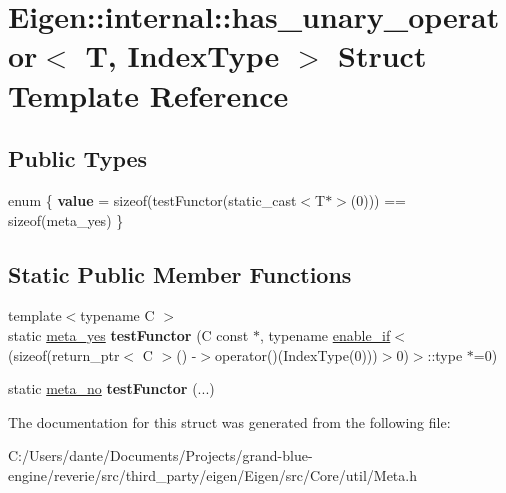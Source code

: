 \hypertarget{struct_eigen_1_1internal_1_1has__unary__operator}{}\section{Eigen\+::internal\+::has\+\_\+unary\+\_\+operator$<$ T, Index\+Type $>$ Struct Template Reference}
\label{struct_eigen_1_1internal_1_1has__unary__operator}
\subsection*{Public Types}
\begin{DoxyCompactItemize}
\item 
\mbox{\label{struct_eigen_1_1internal_1_1has__unary__operator_a4f4fdccaab661de0c2f2f233c7d490cc}} 
enum \{ {\bfseries value} = sizeof(test\+Functor(static\+\_\+cast$<$T$\ast$$>$(0))) == sizeof(meta\+\_\+yes)
 \}
\end{DoxyCompactItemize}
\subsection*{Static Public Member Functions}
\begin{DoxyCompactItemize}
\item 
\mbox{\label{struct_eigen_1_1internal_1_1has__unary__operator_aa954cf07979feb0991fbc745de948edd}} 
{\footnotesize template$<$typename C $>$ }\\static \mbox{\hyperlink{struct_eigen_1_1internal_1_1meta__yes}{meta\+\_\+yes}} {\bfseries test\+Functor} (C const $\ast$, typename \mbox{\hyperlink{struct_eigen_1_1internal_1_1enable__if}{enable\+\_\+if}}$<$(sizeof(return\+\_\+ptr$<$ C $>$() -\/$>$operator()(Index\+Type(0)))$>$0)$>$\+::type $\ast$=0)
\item 
\mbox{\label{struct_eigen_1_1internal_1_1has__unary__operator_aa4170dd8818e2f8a1fc3e075ccadd7b7}} 
static \mbox{\hyperlink{struct_eigen_1_1internal_1_1meta__no}{meta\+\_\+no}} {\bfseries test\+Functor} (...)
\end{DoxyCompactItemize}


The documentation for this struct was generated from the following file\+:\begin{DoxyCompactItemize}
\item 
C\+:/\+Users/dante/\+Documents/\+Projects/grand-\/blue-\/engine/reverie/src/third\+\_\+party/eigen/\+Eigen/src/\+Core/util/Meta.\+h\end{DoxyCompactItemize}
